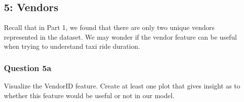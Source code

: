 \documentclass[11pt]{article}
\begin{document}
    \subsection{5: Vendors}\label{vendors}

Recall that in Part 1, we found that there are only two unique vendors
represented in the dataset. We may wonder if the vendor feature can be
useful when trying to understand taxi ride duration.

    \subsubsection{Question 5a}\label{question-5a}

Visualize the VendorID feature. Create at least one plot that gives
insight as to whether this feature would be useful or not in our model.
\end{document}
